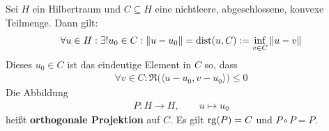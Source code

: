 \begin{lemma}
	Sei $H$ ein Hilbertraum und $C\subseteq H$ eine nichtleere, abgeschlossene, konvexe Teilmenge. 
	Dann gilt:
	\begin{align*}
		\forall u\in H:\exists! u_0\in C:\Vert u-u_0\Vert
		=\operatorname{dist}(u,C)
		:=\inf\limits_{v\in C}\Vert u-v\Vert
	\end{align*}
	Dieses $u_0\in C$ ist das eindeutige Element in $C$ so, dass 
	\begin{align*}
		\forall v\in C:\Re\big(\langle u-u_0,v-u_0\rangle\big)\leq0
	\end{align*}
	Die Abbildung
	\begin{align*}
		P:H\to H,\qquad u\mapsto u_0
	\end{align*}
	heißt \textbf{orthogonale Projektion} auf $C$. 
	Es gilt $\operatorname{rg}(P)=C$ und $P\circ P=P$.
\end{lemma}

